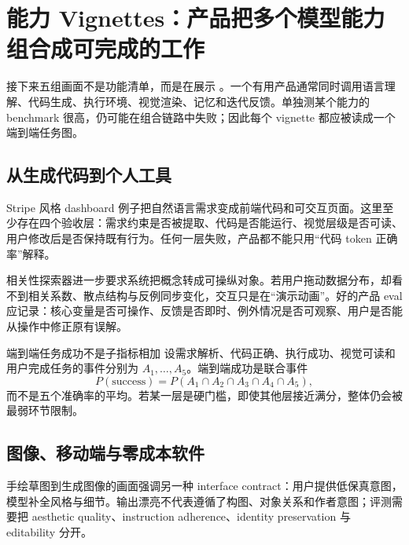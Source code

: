 \section{能力 Vignettes：产品把多个模型能力组合成可完成的工作}

接下来五组画面不是功能清单，而是在展示 。一个有用产品通常同时调用语言理解、代码生成、执行环境、视觉渲染、记忆和迭代反馈。单独测某个能力的 benchmark 很高，仍可能在组合链路中失败；因此每个 vignette 都应被读成一个端到端任务图。

\subsection{从生成代码到个人工具}

Stripe 风格 dashboard 例子把自然语言需求变成前端代码和可交互页面。这里至少存在四个验收层：需求约束是否被提取、代码是否能运行、视觉层级是否可读、用户修改后是否保持既有行为。任何一层失败，产品都不能只用“代码 token 正确率”解释。



相关性探索器进一步要求系统把概念转成可操纵对象。若用户拖动数据分布，却看不到相关系数、散点结构与反例同步变化，交互只是在“演示动画”。好的产品 eval 应记录：核心变量是否可操作、反馈是否即时、例外情况是否可观察、用户是否能从操作中修正原有误解。

\begin{importantbox}{端到端任务成功不是子指标相加}
设需求解析、代码正确、执行成功、视觉可读和用户完成任务的事件分别为 $A_1,\dots,A_5$。端到端成功是联合事件
\[
P(\text{success})=P(A_1\cap A_2\cap A_3\cap A_4\cap A_5),
\]
而不是五个准确率的平均。若某一层是硬门槛，即使其他层接近满分，整体仍会被最弱环节限制。
\end{importantbox}

\subsection{图像、移动端与零成本软件}

手绘草图到生成图像的画面强调另一种 interface contract：用户提供低保真意图，模型补全风格与细节。输出漂亮不代表遵循了构图、对象关系和作者意图；评测需要把 aesthetic quality、instruction adherence、identity preservation 与 editability 分开。

